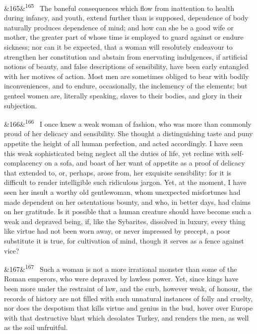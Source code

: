 \documentclass[12pt]{article}
\newcommand{\para}[1][]{\par\noindent\ifx&#1&\else\textsuperscript{\footnotesize #1}~\fi}
\begin{document}
\para[165] The baneful consequences which flow from inattention to health during infancy, and youth, extend further than is supposed, dependence of body naturally produces dependence of mind; and how can she be a good wife or mother, the greater part of whose time is employed to guard against or endure sickness; nor can it be expected, that a woman will resolutely endeavour to strengthen her constitution and abstain from enervating indulgences, if artificial notions of beauty, and false descriptions of sensibility, have been early entangled with her motives of action. Most men are sometimes obliged to bear with bodily inconveniences, and to endure, occasionally, the inclemency of the elements; but genteel women are, literally speaking, slaves to their bodies, and glory in their subjection.

\para[166] I once knew a weak woman of fashion, who was more than commonly proud of her delicacy and sensibility. She thought a distinguishing taste and puny appetite the height of all human perfection, and acted accordingly. I have seen this weak sophisticated being neglect all the duties of life, yet recline with self-complacency on a sofa, and boast of her want of appetite as a proof of delicacy that extended to, or, perhaps, arose from, her exquisite sensibility: for it is difficult to render intelligible such ridiculous jargon. Yet, at the moment, I have seen her insult a worthy old gentlewoman, whom unexpected misfortunes had made dependent on her ostentatious bounty, and who, in better days, had claims on her gratitude. Is it possible that a human creature should have become such a weak and depraved being, if, like the Sybarites, dissolved in luxury, every thing like virtue had not been worn away, or never impressed by precept, a poor substitute it is true, for cultivation of mind, though it serves as a fence against vice?

\para[167] Such a woman is not a more irrational monster than some of the Roman emperors, who were depraved by lawless power. Yet, since kings have been more under the restraint of law, and the curb, however weak, of honour, the records of history are not filled with such unnatural instances of folly and cruelty, nor does the despotism that kills virtue and genius in the bud, hover over Europe with that destructive blast which desolates Turkey, and renders the men, as well as the soil unfruitful.
\end{document}

